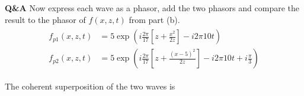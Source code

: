 \documentclass[main.tex]{subfiles}
\begin{document}






\textbf{Q\&A} Now express each wave as a phasor, add the two phasors and compare the result to the phasor of $f(x,z,t)$ from part (b).\\

\begin{equation}\label{eq:ws_4}
\begin{aligned} 
\begin{aligned} f_{p 1}(x, z, t) &=5 \exp \left(i \frac{2 \pi}{17}\left[z+\frac{x^{2}}{2 z}\right]-i 2 \pi 10 t\right) \\ 
f_{p 2}(x, z, t) &=5 \exp \left(i \frac{2 \pi}{17}\left[z+\frac{(x-5)^{2}}{2 z}\right]-i 2 \pi 10 t+i \frac{\pi}{3}\right) \end{aligned}
\end{aligned}
\end{equation}

The coherent superposition of the two waves is \\
\end{document}
